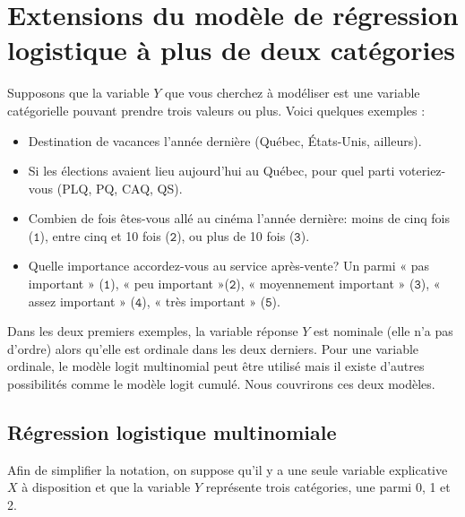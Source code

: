 \documentclass[
  11pt,
  letterpaper,
]{book}
\providecommand{\tightlist}{%
  \setlength{\itemsep}{0pt}\setlength{\parskip}{0pt}}
\theoremstyle{definition}
\theoremstyle{definition}
\theoremstyle{definition}
\theoremstyle{remark}
\begin{document}
\hypertarget{extensions-du-moduxe8le-de-ruxe9gression-logistique-uxe0-plus-de-deux-catuxe9gories}{%
\section{Extensions du modèle de régression logistique à plus de deux catégories}\label{extensions-du-moduxe8le-de-ruxe9gression-logistique-uxe0-plus-de-deux-catuxe9gories}}

Supposons que la variable \(Y\) que vous cherchez à modéliser est une variable catégorielle pouvant prendre trois valeurs ou plus. Voici quelques exemples :

\begin{itemize}
\tightlist
\item
  Destination de vacances l'année dernière (Québec, États-Unis, ailleurs).
\item
  Si les élections avaient lieu aujourd'hui au Québec, pour quel parti voteriez-vous (PLQ, PQ, CAQ, QS).
\item
  Combien de fois êtes-vous allé au cinéma l'année dernière: moins de cinq fois (\(\texttt{1}\)), entre cinq et 10 fois (\(\texttt{2}\)), ou plus de 10 fois (\(\texttt{3}\)).
\item
  Quelle importance accordez-vous au service après-vente? Un parmi « pas important » (\(\texttt{1}\)), « peu important »(\(\texttt{2}\)), « moyennement important » (\(\texttt{3}\)), « assez important » (\(\texttt{4}\)), « très important » (\(\texttt{5}\)).
\end{itemize}

Dans les deux premiers exemples, la variable réponse \(Y\) est nominale (elle n'a pas d'ordre) alors qu'elle est ordinale dans les deux derniers. Pour une variable ordinale, le modèle logit multinomial peut être utilisé mais il existe d'autres possibilités comme le modèle logit cumulé. Nous couvrirons ces deux modèles.

\hypertarget{ruxe9gression-logistique-multinomiale}{%
\subsection{Régression logistique multinomiale}\label{ruxe9gression-logistique-multinomiale}}

Afin de simplifier la notation, on suppose qu'il y a une seule variable explicative \(X\) à disposition et que la variable \(Y\) représente trois catégories, une parmi 0, 1 et 2.
\end{document}
